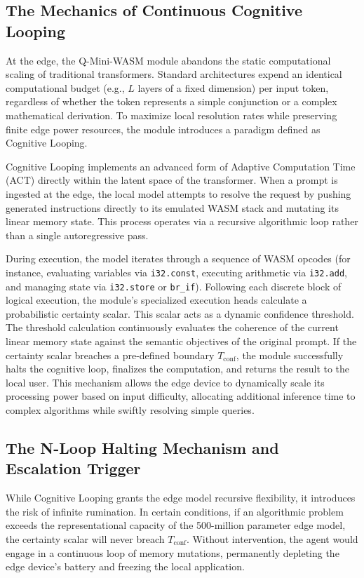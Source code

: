 \documentclass[11pt,a4paper]{article}
\begin{document}
\subsection{The Mechanics of Continuous Cognitive Looping}

At the edge, the Q-Mini-WASM module abandons the static computational scaling of traditional transformers. Standard architectures expend an identical computational budget (e.g., $L$ layers of a fixed dimension) per input token, regardless of whether the token represents a simple conjunction or a complex mathematical derivation. To maximize local resolution rates while preserving finite edge power resources, the module introduces a paradigm defined as Cognitive Looping.

Cognitive Looping implements an advanced form of Adaptive Computation Time (ACT) directly within the latent space of the transformer. When a prompt is ingested at the edge, the local model attempts to resolve the request by pushing generated instructions directly to its emulated WASM stack and mutating its linear memory state. This process operates via a recursive algorithmic loop rather than a single autoregressive pass.

During execution, the model iterates through a sequence of WASM opcodes (for instance, evaluating variables via \texttt{i32.const}, executing arithmetic via \texttt{i32.add}, and managing state via \texttt{i32.store} or \texttt{br\_if}). Following each discrete block of logical execution, the module's specialized execution heads calculate a probabilistic certainty scalar. This scalar acts as a dynamic confidence threshold. The threshold calculation continuously evaluates the coherence of the current linear memory state against the semantic objectives of the original prompt. If the certainty scalar breaches a pre-defined boundary $T_{\mathrm{conf}}$, the module successfully halts the cognitive loop, finalizes the computation, and returns the result to the local user. This mechanism allows the edge device to dynamically scale its processing power based on input difficulty, allocating additional inference time to complex algorithms while swiftly resolving simple queries.

\subsection{The N-Loop Halting Mechanism and Escalation Trigger}

While Cognitive Looping grants the edge model recursive flexibility, it introduces the risk of infinite rumination. In certain conditions, if an algorithmic problem exceeds the representational capacity of the 500-million parameter edge model, the certainty scalar will never breach $T_{\mathrm{conf}}$. Without intervention, the agent would engage in a continuous loop of memory mutations, permanently depleting the edge device's battery and freezing the local application.
\end{document}
